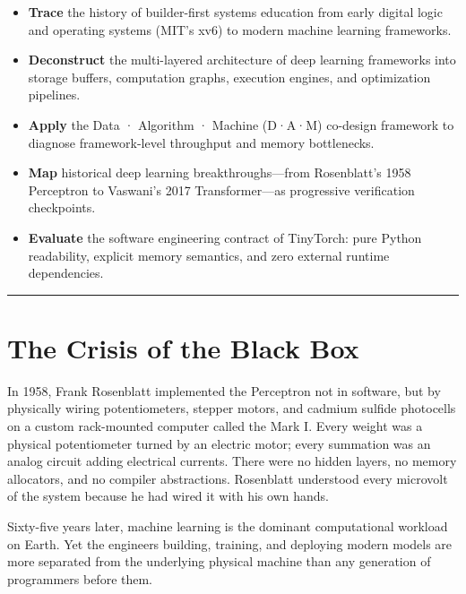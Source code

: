 \documentclass[
  letterpaper,
]{scrbook}
\providecommand{\tightlist}{%
  \setlength{\itemsep}{0pt}\setlength{\parskip}{0pt}}
\begin{document}

\begin{itemize}
\tightlist
\item
  \textbf{Trace} the history of builder-first systems education from
  early digital logic and operating systems (MIT's xv6) to modern
  machine learning frameworks.
\item
  \textbf{Deconstruct} the multi-layered architecture of deep learning
  frameworks into storage buffers, computation graphs, execution
  engines, and optimization pipelines.
\item
  \textbf{Apply} the Data · Algorithm · Machine (D·A·M) co-design
  framework to diagnose framework-level throughput and memory
  bottlenecks.
\item
  \textbf{Map} historical deep learning breakthroughs---from
  Rosenblatt's 1958 Perceptron to Vaswani's 2017 Transformer---as
  progressive verification checkpoints.
\item
  \textbf{Evaluate} the software engineering contract of TinyTorch: pure
  Python readability, explicit memory semantics, and zero external
  runtime dependencies.
\end{itemize}

\begin{center}\rule{0.5\linewidth}{0.5pt}\end{center}

\section*{The Crisis of the Black
Box}\label{the-crisis-of-the-black-box}


In 1958, Frank Rosenblatt implemented the Perceptron not in software,
but by physically wiring potentiometers, stepper motors, and cadmium
sulfide photocells on a custom rack-mounted computer called the Mark I.
Every weight was a physical potentiometer turned by an electric motor;
every summation was an analog circuit adding electrical currents. There
were no hidden layers, no memory allocators, and no compiler
abstractions. Rosenblatt understood every microvolt of the system
because he had wired it with his own hands.

Sixty-five years later, machine learning is the dominant computational
workload on Earth. Yet the engineers building, training, and deploying
modern models are more separated from the underlying physical machine
than any generation of programmers before them.
\end{document}
